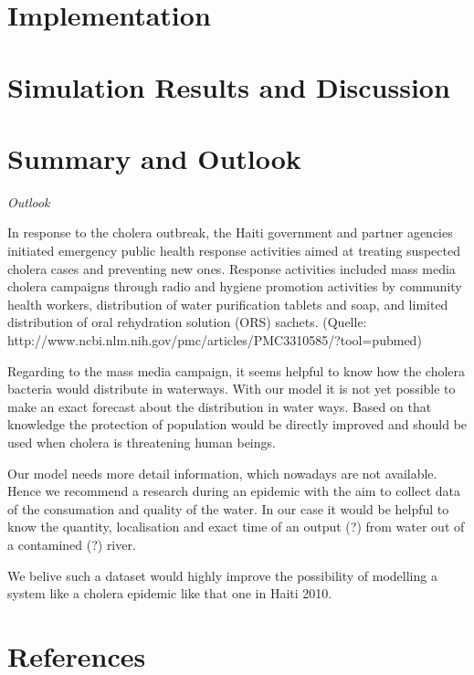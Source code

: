 \documentclass[11pt]{article}
\begin{document}
\section{Implementation}

\section{Simulation Results and Discussion}

\section{Summary and Outlook}



\noindent\textit{Outlook}

In response to the cholera outbreak, the Haiti government and partner agencies initiated emergency public health response activities aimed at treating suspected cholera cases and preventing new ones. Response activities included mass media cholera campaigns through radio and hygiene promotion activities by community health workers, distribution of water purification tablets and soap, and limited distribution of oral rehydration solution (ORS) sachets. (Quelle: http://www.ncbi.nlm.nih.gov/pmc/articles/PMC3310585/?tool=pubmed)

Regarding to the mass media campaign, it seems helpful to know how the cholera bacteria would distribute in waterways. With our model it is not yet possible to make an exact forecast about the distribution in water ways. Based on that knowledge the protection of population would be directly improved and should be used when cholera is threatening human beings.

Our model needs more detail information, which nowadays are not available. Hence we recommend a research during an epidemic with the aim to collect data of the consumation and quality of the water. In our case it would be helpful to know the quantity, localisation and exact time of an output (?) from water out of a contamined (?) river.

We belive such a dataset would highly improve the possibility of modelling a system like a cholera epidemic like that one in Haiti 2010.

\section{References}
\end{document}
